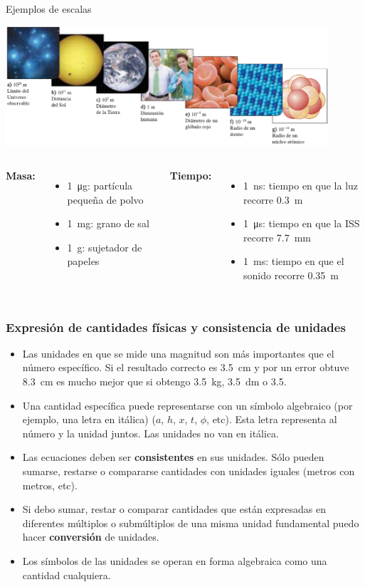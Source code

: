 \documentclass[9pt, aspectratio=169]{beamer}
\begin{document}
\begin{frame}{Ejemplos de escalas}
    \begin{center}
        \includegraphics[width=0.9\textwidth]{figs/escalas-l.png}
    \end{center}
\begin{columns}[t]
\cx
\textbf{Masa:}
\begin{itemize}
    \item \qty{1}{\ug}: partícula pequeña de polvo
    \item \qty{1}{\mg}: grano de sal 
    \item \qty{1}{g}: sujetador de papeles
\end{itemize}

\cx
\textbf{Tiempo:}
\begin{itemize}
    \item \qty{1}{\ns}: tiempo en que la luz recorre \qty{0.3}{m}
    \item \qty{1}{\us}: tiempo en que la ISS recorre \qty{7.7}{mm}
    \item \qty{1}{\ms}: tiempo en que el sonido recorre \qty{0.35}{m}
\end{itemize}
\end{columns}
\end{frame}


\begin{frame}
  \frametitle{Expresión de cantidades físicas y consistencia de unidades}
\Large
\begin{itemize}
    \item Las unidades en que se mide una magnitud son más importantes que el número específico. Si el resultado correcto es \qty{3.5}{\cm} y por un error obtuve \qty{8.3}{\cm} es mucho mejor que si obtengo \qty{3.5}{\kg}, \qty{3.5}{\dm} o \num{3.5}.
 \item Una cantidad específica puede representarse con un símbolo algebraico (por ejemplo, una letra en itálica) ($a$, $h$, $x$, $t$, $\phi$, etc). Esta letra representa al número y la unidad juntos. Las unidades no van en itálica. 
 \item Las ecuaciones deben ser {\bf consistentes} en sus unidades. Sólo pueden sumarse, restarse o compararse cantidades con unidades iguales (metros con metros, etc).
 \item Si debo sumar, restar o comparar cantidades que están expresadas en diferentes múltiplos o submúltiplos de una misma unidad fundamental puedo hacer {\bf conversión} de unidades.
 \item Los símbolos de las unidades se operan en forma algebraica como una cantidad cualquiera.
\end{itemize}

\end{frame}
\end{document}

